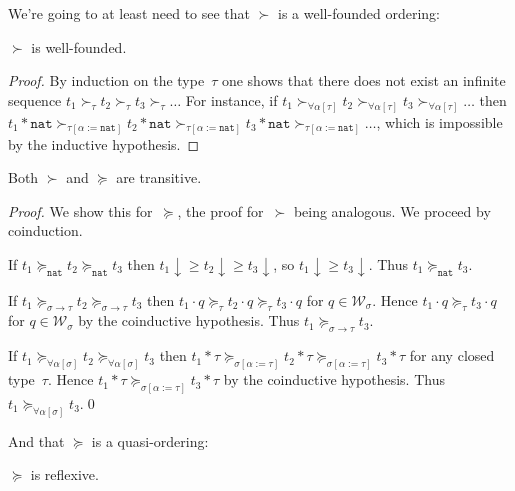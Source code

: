 \documentclass[runningheads,a4paper]{llncs}
\newcommand{\World}{\mathcal{W}}
\newcommand{\app}[2]{#1 \cdot #2}
\newcommand{\tapp}[2]{#1 * #2}
\newcommand{\subst}[2]{#1:=#2}
\newcommand{\nat}{\mathtt{nat}}
\newcommand{\da}{\downarrow}
\begin{document}
We're going to at least need to see that $\succ$ is a well-founded ordering:

\begin{lemma}
$\succ$ is well-founded.
\end{lemma}

\begin{proof}
  By induction on the type~$\tau$ one shows that there does not exist
  an infinite sequence
  $t_1 \succ_\tau t_2 \succ_\tau t_3 \succ_\tau \ldots$ For instance,
  if
  $t_1 \succ_{\forall\alpha[\tau]} t_2 \succ_{\forall\alpha[\tau]} t_3
  \succ_{\forall\alpha[\tau]} \ldots$ then
  $\tapp{t_1}{\nat} \succ_{\tau[\subst{\alpha}{\nat}]}
  \tapp{t_2}{\nat} \succ_{\tau[\subst{\alpha}{\nat}]} \tapp{t_3}{\nat}
  \succ_{\tau[\subst{\alpha}{\nat}]} \ldots$, which is impossible by
  the inductive hypothesis.
\end{proof}

\begin{lemma}
Both $\succ$ and $\succeq$ are transitive.
\end{lemma}

\begin{proof}
  We show this for~$\succeq$, the proof for~$\succ$ being
  analogous. We proceed by coinduction.

  If $t_1 \succeq_\nat t_2 \succeq_\nat t_3$ then
  $t_1\da \ge t_2\da \ge t_3\da$, so $t_1\da \ge t_3\da$. Thus
  $t_1 \succeq_\nat t_3$.

  If $t_1 \succeq_{\sigma\to\tau}t_2\succeq_{\sigma\to\tau}t_3$ then
  $\app{t_1}{q}\succeq_{\tau}\app{t_2}{q}\succeq_\tau\app{t_3}{q}$ for
  $q \in \World_\sigma$. Hence $\app{t_1}{q}\succeq_\tau\app{t_3}{q}$
  for $q \in \World_\sigma$ by the coinductive hypothesis. Thus
  $t_1\succeq_{\sigma\to\tau} t_3$.

  If $t_1 \succeq_{\forall\alpha[\sigma]}t_2\succeq_{\forall\alpha[\sigma]}t_3$ then
  $\tapp{t_1}{\tau}\succeq_{\sigma[\subst{\alpha}{\tau}]}\tapp{t_2}{\tau}\succeq_{\sigma[\subst{\alpha}{\tau}]}\tapp{t_3}{\tau}$ for
  any closed type~$\tau$. Hence
  $\tapp{t_1}{\tau}\succeq_{\sigma[\subst{\alpha}{\tau}]}\tapp{t_3}{\tau}$
  by the coinductive hypothesis. Thus $t_1\succeq_{\forall\alpha[\sigma]} t_3$.\qed
\end{proof}

And that $\succeq$ is a quasi-ordering:

\begin{lemma}
$\succeq$ is reflexive.
\end{lemma}
\end{document}
